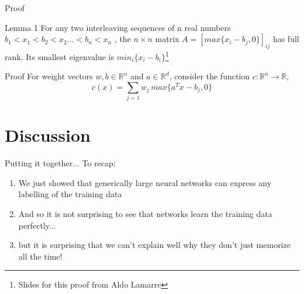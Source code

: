 \documentclass[10pt]{beamer}
\begin{document}
\begin{frame}{Proof }
\begin{block}{Lemma 1}
For any two interleaving sequences of n real numbers $b_1 < x_1 < b_2 < x_2 \dots < b_n < x_n$
, the $n \times n$ matrix $A = [max \{x_i - b_j,0\}]_{ij}$ has full rank. Its smallest eigenvalue is
$min_i\{ x_i - b_i\}$\footnote{Slides for this proof from Aldo Lamarre}
\end{block}

	
\end{frame}	
\begin{frame}{Proof}
For weight vectors $w, b \in \mathbb{R}^n$ and $a \in \mathbb{R}^d$, consider the function $c : \mathbb{R}^n \to \mathbb{R}$,
\[c(x) =\sum \limits_{j=1}w_j\, max\{a^Tx - b_j , 0\}\]

\end{frame}	
\section{Discussion}
\begin{frame}{Putting it together... }
	To recap:
	\begin{enumerate}
		\item We just showed that generically large neural networks can express any labelling of the training data
		\item And so it is not surprising to see that networks learn the training data perfectly...
		\item but it is surprising that we can't explain well why they don't just memorize all the time!
	\end{enumerate}
\end{frame}
\end{document}

